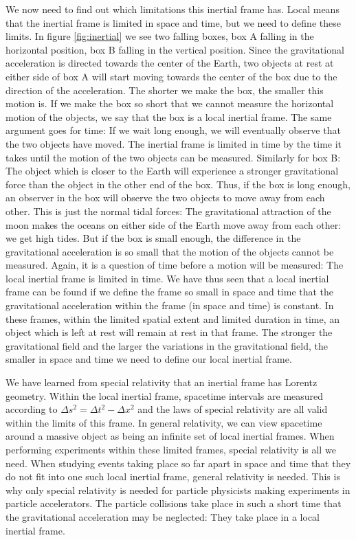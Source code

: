 {\begin{multicols}{2}
We now need to find out which limitations this inertial frame has. Local means that the inertial frame is limited in space and time, but we need to define these limits. In figure \ref{fig:inertial} we see two falling boxes, box A falling in the horizontal position, box B falling in the vertical position. Since the gravitational acceleration is directed towards the center of the Earth, two objects at rest at either side of box A will start moving towards the center of the box due to the direction of the acceleration. The shorter we make the box, the smaller this motion is. If we make the box so short that we cannot measure the horizontal motion of the objects, we say that the box is a local inertial frame. The same argument goes for time: If we wait long enough, we will eventually observe that the two objects have moved. The inertial frame is limited in time by the time it takes until the motion of the two objects can be measured. Similarly for box B: The object which is closer to the Earth will experience a stronger gravitational force than the object in the other end of the box. Thus, if the box is long enough, an observer in the box will observe the two objects to move away from each other. This is just the normal tidal forces: The gravitational attraction of the moon makes the oceans on either side of the Earth move away from each other: we get high tides. But if the box is small enough, the difference in the gravitational acceleration is so small that the motion of the objects cannot be measured. Again, it is a question of time before a motion will be measured: The local inertial frame is limited in time. We have thus seen that a local inertial frame can be found if we define the frame so small in space and time that the gravitational acceleration within the frame (in space and time) is constant. In these frames, within the limited spatial extent and limited duration in time, an object which is left at rest will remain at rest in that frame. The stronger the gravitational field and the larger the variations in the gravitational field, the smaller in space and time we need to define our local inertial frame. 

We have learned from special relativity that an inertial frame has Lorentz geometry. Within the local inertial frame, spacetime intervals are measured according to $\Delta s^2=\Delta t^2-\Delta x^2$ and the laws of special relativity are all valid within the limits of this frame. In general relativity, we can view spacetime around a massive object as being an infinite set of local inertial frames. When performing experiments within these limited frames, special relativity is all we need. When studying events taking place so far apart in space and time that they do not fit into one such local inertial frame, general relativity is needed. This is why only special relativity is needed for particle physicists making experiments in particle accelerators. The particle collisions take place in such a short time that the gravitational acceleration may be neglected: They take place in a local inertial frame.


\end{multicols}}
